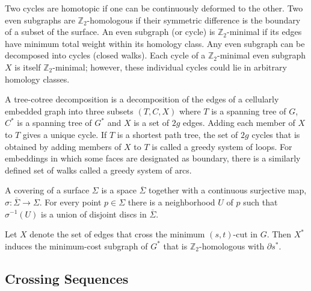 \documentclass[natbib]{svcyclop}
\def\NOTE#1{\textcolor{Red}{\textbf{\textsf{••• #1 •••}}}}
\def\Z{\mathbb{Z}}
\begin{document}
Two cycles are homotopic if one can be continuously deformed to the other.  
Two even subgraphs are $\mathbb{Z}_2$-homologous if their symmetric difference is the boundary of a subset of the surface.
An even subgraph (or cycle) is $\Z_2$-minimal if its edges have minimum total weight within its homology class.
Any even subgraph can be decomposed into cycles (closed walks).
Each cycle of a $\Z_2$-minimal even subgraph $X$ is itself $\Z_2$-minimal; however, these individual cycles could lie in arbitrary homology classes.

A tree-cotree decomposition is a decomposition of the edges of a cellularly embedded graph into three subsets $(T, C, X)$ where $T$ is a spanning tree of $G$, $C^*$ is a spanning tree of $G^*$ and $X$ is a set of $2g$ edges.  
Adding each member of $X$ to $T$ gives a unique cycle.  
If $T$ is a shortest path tree, the set of $2g$ cycles that is obtained by adding members of $X$ to $T$ is called a greedy system of loops.
For embeddings in which some faces are designated as boundary, there is a similarly defined set of walks called a greedy system of arcs.

A covering of a surface $\Sigma$ is a space $\overline{\Sigma}$ together with a continuous surjective map, $\sigma: \overline{\Sigma} \rightarrow \Sigma$. For every point $p \in \Sigma$ there is a neighborhood $U$ of $p$ such that $\sigma^{-1}(U)$ is a union of disjoint discs in $\overline{\Sigma}$.

Let $X$ denote the set of edges that cross the minimum $(s,t)$-cut in $G$.  Then $X^*$ induces the minimum-cost subgraph of $G^*$ that is $\Z_2$-homologous with $\partial s^*$.


\subsection{Crossing Sequences}
\end{document}
